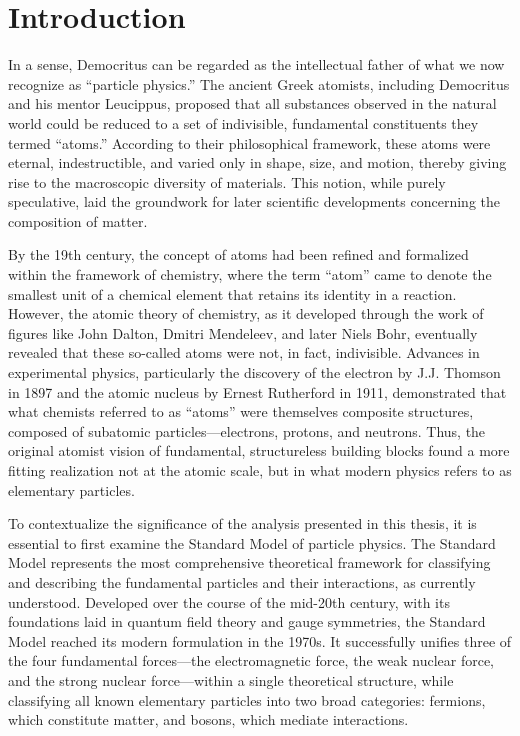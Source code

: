 \chapter{Introduction} \label{chap:chap-1}




In a sense, Democritus can be regarded as the intellectual father of what we now recognize as ``particle physics.'' The ancient Greek atomists, including Democritus and his mentor Leucippus, proposed that all substances observed in the natural world could be reduced to a set of indivisible, fundamental constituents they termed ``atoms.'' According to their philosophical framework, these atoms were eternal, indestructible, and varied only in shape, size, and motion, thereby giving rise to the macroscopic diversity of materials. This notion, while purely speculative, laid the groundwork for later scientific developments concerning the composition of matter.

By the 19th century, the concept of atoms had been refined and formalized within the framework of chemistry, where the term ``atom'' came to denote the smallest unit of a chemical element that retains its identity in a reaction. However, the atomic theory of chemistry, as it developed through the work of figures like John Dalton, Dmitri Mendeleev, and later Niels Bohr, eventually revealed that these so-called atoms were not, in fact, indivisible. Advances in experimental physics, particularly the discovery of the electron by J.J. Thomson in 1897 and the atomic nucleus by Ernest Rutherford in 1911, demonstrated that what chemists referred to as ``atoms'' were themselves composite structures, composed of subatomic particles—electrons, protons, and neutrons. Thus, the original atomist vision of fundamental, structureless building blocks found a more fitting realization not at the atomic scale, but in what modern physics refers to as elementary particles.

To contextualize the significance of the analysis presented in this thesis, it is essential to first examine the Standard Model of particle physics. The Standard Model represents the most comprehensive theoretical framework for classifying and describing the fundamental particles and their interactions, as currently understood. Developed over the course of the mid-20th century, with its foundations laid in quantum field theory and gauge symmetries, the Standard Model reached its modern formulation in the 1970s. It successfully unifies three of the four fundamental forces---the electromagnetic force, the weak nuclear force, and the strong nuclear force---within a single theoretical structure, while classifying all known elementary particles into two broad categories: fermions, which constitute matter, and bosons, which mediate interactions.

